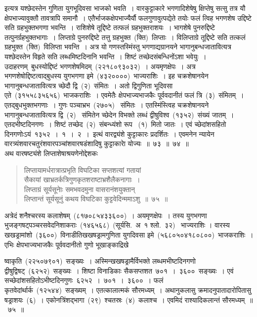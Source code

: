 \documentclass[11pt, openany]{book}
\begin{document}
\noindent
इत्यत्र यश्छेदस्तेन गुणिता युगभूदिवसा भाजको भवति~। वारकुट्टाकारे भगणादिशेषेषु क्षिप्तेषु सत्सु तत्र यौ क्षेपभाज्यावुक्तौ तावत्रापि समानौ~। एतैर्भाजकक्षेपभाज्यैर्यौ फलगुणावुत्पद्येते तयोः फलं त्विह भगणशेष उद्दिष्टे सति ग्रहभुक्तभगणा भवन्ति~। राशिशेषे तूद्दिष्टे तत्फलं ग्रहभुक्तराशयः~। भागशेषे पुनरुद्दिष्टे तत्पुनर्ग्रहभुक्तभागाः~। लिप्ताग्रे पुनरुद्दिष्टे तत्तु ग्रहभुक्त~(क्ति)~लिप्ताः~। विलिप्ताग्रे तूद्दिष्टे सति तत्कलं ग्रहभुक्त~(क्ति)~विलिप्ता भवन्ति~। अत्र यो गणस्तस्मिंस्तु भगणाद्यग्रानयने भागानुबन्धजातावित्यत्र यश्छेदस्तेन विहृते सति लब्धमिष्टदिनानि भवन्ति~। शिष्टं तच्छेदसंबन्धिनोंऽशा भवेयुः~। उदाहरणम्\textendash\ बुधस्योद्दिष्टं भगणशेषमिदम्~(२२१८०९३०३२)~। अयमृणक्षेपः~। अत्र भगणशेषोद्दिष्टत्वाद्बुधस्य युगभगणा इमे~(४३२००००)~भाज्यराशिः~। इह चक्रशेषानयेन भागानुबन्धजातावित्यत्र च्छेदौ द्वि~(२)~संमितः~। अतो द्विगुणिता भूदिवसा एते~(३१५५८३५६५६)~भाजकराशिः~। एवमेतैः क्षेपभाज्यभाजकैः पूर्ववदानीतं फलं त्रि~(३)~संमितम्~। एतद्बुधभुक्तभगणाः~। गुणः पञ्चाभ्रभ~(२७०५)~ संमितः~। एतस्मिंस्त्विह चक्रशेषानयने भागानुबन्धजातावित्यत्र द्वि~(२)~ संमितेन च्छेदेन विभक्ते लब्धं द्वीषुविश्व~(१३५२)~संख्यं जातम्~। एतदभीष्टदिनगणः~। शिष्टं तच्छेद~(२)~संबन्ध्यंशो रूप ~(१)~मितो जातः~। एवं च्छेदांशसहितो दिनगणोःऽयं~१३५२~।~१~।~२~।~इत्थं वारद्व्यंशे कुट्टाकारः प्रदर्शितः~। एवमनेन न्यायेन वारत्र्यंशवारचतुरंशवारपञ्चांशवारषडंशादिषु कुट्टाकाराे योज्यः~॥~७३~॥~७४~॥\\

\indent
अथ वारषष्ट्यंशे लिप्ताशेषाश्रयणेनोद्देशकः\textendash

\begin{quote}
{\ku लिप्तायामर्धरात्रात्प्रभृति विघटिका सप्तशत्यां गतायां\\
सैकायां खाभ्रतर्कत्रिगुणकृतशराष्टाभ्रशैलैकनागाः~।\\
लिप्ताग्रं सूर्यसूनाेः समभवदमुना वासरानंशयुक्तान्\\
लिप्तान्तं सूर्यसूनुं कथय विघटिका कुट्टवेदिन्ममाऽशु~॥~७५~॥}
\end{quote}

\indent
अत्रेदं शनैश्चरस्य कलाशेषम्~(८१७०८५४३३६००)~। अयमृणक्षेपः~। तस्य युगभगणा भुजङ्गषट्पञ्चरसवेदनिशाकराः~(१४६५६८)~(सूर्यसि.~अ~१ श्लो.~३२)~ भाज्यराशिः । वारस्य खखड्रामांशो~(३६००)~विनाडीतिखखषड्रामगुणिता युगदिवसा इमे~(५६८०५०४१८०८००)~भाजकराशिः~। एभिः क्षेपभाज्यभाजकैः पूर्ववदानीतो गुणो भूखाङ्काद्रिखे\textendash



\newpage
\thispagestyle{fancy}
\fancyhf{}

\noindent
ष्वाकृति~(२२५०७९०१)~सङ्ख्यः~। अस्मिन्खखषड्रामैर्विभक्ते लब्धमभीष्टदिनगणो द्वीषुद्विषट्~(६२५२)~सङ्ख्यः~। शिष्टा विनाडिकाः सैकसप्तशत~७०१~।~३६००~सङ्ख्यः~। एवं सच्छेदांशसहितोऽभीष्टदिनगुणः~६२५२~।~७०१~।~३६००~। फलं कृतवेदांर्थार्क~(१२५४४)~सङ्ख्यम्~। एतत्कालात्मकं सौरमध्यम्~। अथानुकलासु क्रमादनुपातादारोपितासु षड्राशयः~(६)~। एकोनत्रिंशद्भागा~(२९)~श्चतस्रः~(४)~कलाश्च~। एवमिदं राश्यादिकलान्तं सौरमध्यम्~॥~७५~॥\\
\end{document}
